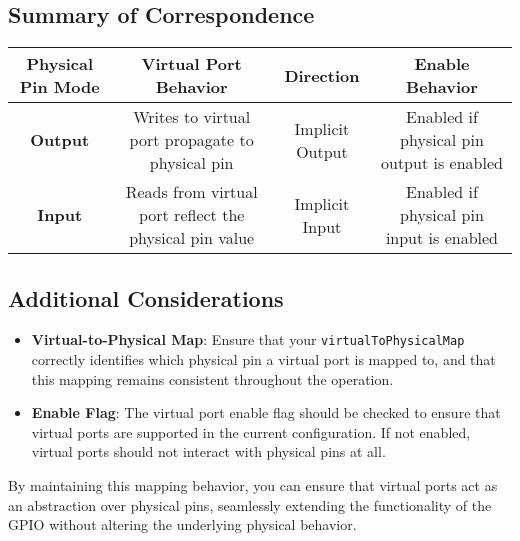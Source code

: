 \subsection{Summary of Correspondence}

\begin{table}[ht]
    \centering
    \begin{tabular}{|c|c|c|c|}
        \hline
        \textbf{Physical Pin Mode} & \textbf{Virtual Port Behavior} & \textbf{Direction} & \textbf{Enable Behavior} \\
        \hline
        \textbf{Output} & Writes to virtual port propagate to physical pin & Implicit Output & Enabled if physical pin output is enabled \\
        \hline
        \textbf{Input} & Reads from virtual port reflect the physical pin value & Implicit Input & Enabled if physical pin input is enabled \\
        \hline
    \end{tabular}
\end{table}

\subsection{Additional Considerations}
\begin{itemize}
    \item \textbf{Virtual-to-Physical Map}: Ensure that your \texttt{virtualToPhysicalMap} correctly identifies which physical pin a virtual port is mapped to, and that this mapping remains consistent throughout the operation.
    \item \textbf{Enable Flag}: The virtual port enable flag should be checked to ensure that virtual ports are supported in the current configuration. If not enabled, virtual ports should not interact with physical pins at all.
\end{itemize}

By maintaining this mapping behavior, you can ensure that virtual ports act as an abstraction over physical pins, seamlessly extending the functionality of the GPIO without altering the underlying physical behavior.
